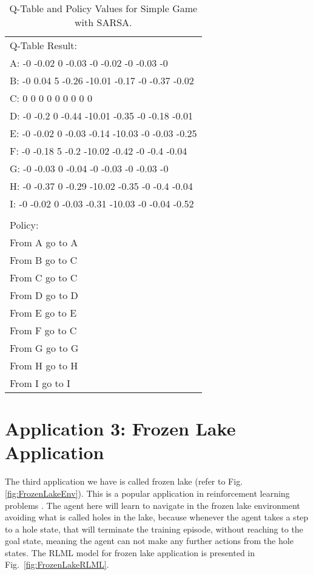 \documentclass[11pt,letterpaper]{ryersonSGSThesis}
\begin{document}
\begin{ryersonSGSThesis}
    \begin{table}[h!]
    \centering
    \begin{tabular}{|l|} 
        \hline
        Q-Table Result: \\
        A:  -0 -0.02 0 -0.03 -0 -0.02 -0 -0.03 -0 \\
        B:  -0 0.04 5 -0.26 -10.01 -0.17 -0 -0.37 -0.02 \\ 
        C:  0 0 0 0 0 0 0 0 0 \\
        D:  -0 -0.2 0 -0.44 -10.01 -0.35 -0 -0.18 -0.01 \\
        E:  -0 -0.02 0 -0.03 -0.14 -10.03 -0 -0.03 -0.25 \\
        F:  -0 -0.18 5 -0.2 -10.02 -0.42 -0 -0.4 -0.04 \\
        G:  -0 -0.03 0 -0.04 -0 -0.03 -0 -0.03 -0 \\
        H:  -0 -0.37 0 -0.29 -10.02 -0.35 -0 -0.4 -0.04 \\ 
        I:  -0 -0.02 0 -0.03 -0.31 -10.03 -0 -0.04 -0.52 \\
        \\
        Policy: \\
        From A go to A \\
        From B go to C \\
        From C go to C \\
        From D go to D \\
        From E go to E \\
        From F go to C \\
        From G go to G \\
        From H go to H \\
        From I go to I \\ [1ex]
        \hline
    \end{tabular}
    \caption{Q-Table and Policy Values for Simple Game with SARSA.} \label{table:simpleGameQTablePolicySARSA}
    \end{table}
    
    \section{Application 3: Frozen Lake Application}
    
    The third application we have is called frozen lake (refer to Fig. \ref{fig:FrozenLakeEnv}). This is a popular application in reinforcement learning problems \cite{Ravichandiran2018}. The agent here will learn to navigate in the frozen lake environment avoiding what is called holes in the lake, because whenever the agent takes a step to a hole state, that will terminate the training episode, without reaching to the goal state, meaning the agent can not make any further actions from the hole states. The RLML model for frozen lake application is presented in Fig.~\ref{fig:FrozenLakeRLML}.
    

\end{ryersonSGSThesis}
\end{document}
